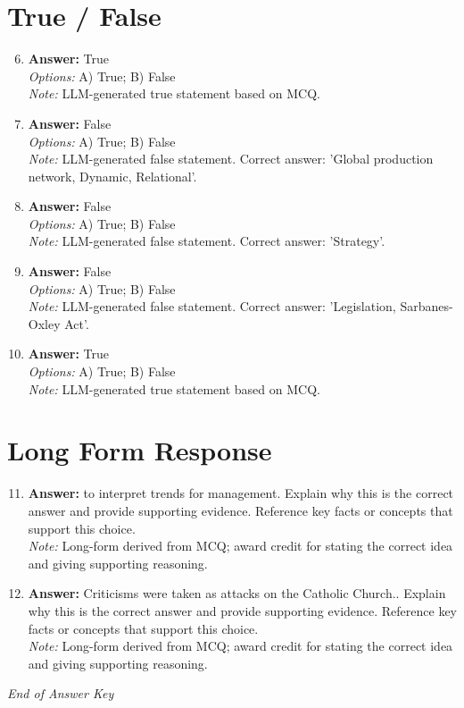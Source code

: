 \documentclass[12pt]{article}
\begin{document}
\section*{True / False}
\begin{enumerate}[label=\arabic*.]
\setcounter{enumi}{5}
\item \textbf{Answer:} True
\\ \textit{Options:} A) True; B) False
\\ \textit{Note:} LLM-generated true statement based on MCQ.
\item \textbf{Answer:} False
\\ \textit{Options:} A) True; B) False
\\ \textit{Note:} LLM-generated false statement. Correct answer: 'Global production network, Dynamic, Relational'.
\item \textbf{Answer:} False
\\ \textit{Options:} A) True; B) False
\\ \textit{Note:} LLM-generated false statement. Correct answer: 'Strategy'.
\item \textbf{Answer:} False
\\ \textit{Options:} A) True; B) False
\\ \textit{Note:} LLM-generated false statement. Correct answer: 'Legislation, Sarbanes-Oxley Act'.
\item \textbf{Answer:} True
\\ \textit{Options:} A) True; B) False
\\ \textit{Note:} LLM-generated true statement based on MCQ.
\end{enumerate}

\section*{Long Form Response}
\begin{enumerate}[label=\arabic*.]
\setcounter{enumi}{10}
\item \textbf{Answer:} to interpret trends for management. Explain why this is the correct answer and provide supporting evidence. Reference key facts or concepts that support this choice.
\\ \textit{Note:} Long-form derived from MCQ; award credit for stating the correct idea and giving supporting reasoning.
\item \textbf{Answer:} Criticisms were taken as attacks on the Catholic Church.. Explain why this is the correct answer and provide supporting evidence. Reference key facts or concepts that support this choice.
\\ \textit{Note:} Long-form derived from MCQ; award credit for stating the correct idea and giving supporting reasoning.
\end{enumerate}

\vfill
\noindent\textit{End of Answer Key}
\end{document}
